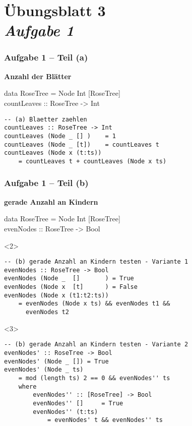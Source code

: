 \documentclass{beamer}
\begin{document}
\section{Übungsblatt 3 \\ \textit{\normalsize Aufgabe 1}}

\begin{frame}[t, fragile] \frametitle{Aufgabe 1 -- Teil (a)}
	\textbf{Anzahl der Blätter}
	
	\begin{ttfamily}
		data RoseTree = Node Int [RoseTree] \\
		countLeaves :: RoseTree -> Int
	\end{ttfamily}
	
	
	\pause \bigskip
	
	\begin{lstlisting}
-- (a) Blaetter zaehlen
countLeaves :: RoseTree -> Int
countLeaves (Node _ [] )    = 1
countLeaves (Node _ [t])    = countLeaves t
countLeaves (Node x (t:ts)) 
	= countLeaves t + countLeaves (Node x ts)
	\end{lstlisting}
\end{frame}

\begin{frame}[t, fragile] \frametitle{Aufgabe 1 -- Teil (b)}
	\textbf{gerade Anzahl an Kindern}
	
	\begin{ttfamily}
		data RoseTree = Node Int [RoseTree] \\
		evenNodes :: RoseTree -> Bool
	\end{ttfamily}
	
	
	\pause \bigskip
	\begin{onlyenv}
		\begin{lstlisting}
-- (b) gerade Anzahl an Kindern testen - Variante 1
evenNodes :: RoseTree -> Bool
evenNodes (Node _  []       ) = True
evenNodes (Node x  [t]      ) = False
evenNodes (Node x (t1:t2:ts)) 
	= evenNodes (Node x ts) && evenNodes t1 && 
	  evenNodes t2
		\end{lstlisting}
	\end{onlyenv}

	\begin{onlyenv}
		\begin{lstlisting}
-- (b) gerade Anzahl an Kindern testen - Variante 2
evenNodes' :: RoseTree -> Bool
evenNodes' (Node _ []) = True
evenNodes' (Node _ ts)
	= mod (length ts) 2 == 0 && evenNodes'' ts
	where
		evenNodes'' :: [RoseTree] -> Bool
		evenNodes'' []     = True
		evenNodes'' (t:ts) 
			= evenNodes' t && evenNodes'' ts
		\end{lstlisting}
	\end{onlyenv}
\end{frame}
\end{document}
